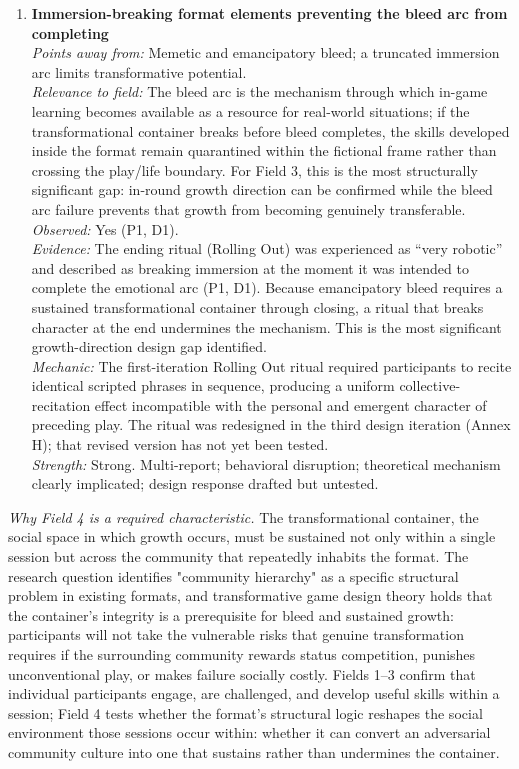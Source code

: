 \begin{enumerate}
\item \textbf{Immersion-breaking format elements preventing the bleed arc from completing}\\
\textit{Points away from:} Memetic and emancipatory bleed; a truncated immersion arc limits transformative potential.\\
\textit{Relevance to field:} The bleed arc is the mechanism through which in-game learning becomes available as a resource for real-world situations; if the transformational container breaks before bleed completes, the skills developed inside the format remain quarantined within the fictional frame rather than crossing the play/life boundary. For Field 3, this is the most structurally significant gap: in-round growth direction can be confirmed while the bleed arc failure prevents that growth from becoming genuinely transferable.\\
\textit{Observed:} Yes (P1, D1).\\
\textit{Evidence:} The ending ritual (Rolling Out) was experienced as ``very robotic'' and described as breaking immersion at the moment it was intended to complete the emotional arc (P1, D1). Because emancipatory bleed requires a sustained transformational container through closing, a ritual that breaks character at the end undermines the mechanism. This is the most significant growth-direction design gap identified.\\
\textit{Mechanic:} The first-iteration Rolling Out ritual required participants to recite identical scripted phrases in sequence, producing a uniform collective-recitation effect incompatible with the personal and emergent character of preceding play. The ritual was redesigned in the third design iteration (Annex H); that revised version has not yet been tested.\\
\textit{Strength:} Strong. Multi-report; behavioral disruption; theoretical mechanism clearly implicated; design response drafted but untested.

\end{enumerate}

\bigskip


\noindent\textit{Why Field 4 is a required characteristic.} The transformational container, the social space in which growth occurs, must be sustained not only within a single session but across the community that repeatedly inhabits the format. The research question identifies "community hierarchy" as a specific structural problem in existing formats, and transformative game design theory holds that the container's integrity is a prerequisite for bleed and sustained growth: participants will not take the vulnerable risks that genuine transformation requires if the surrounding community rewards status competition, punishes unconventional play, or makes failure socially costly. Fields 1--3 confirm that individual participants engage, are challenged, and develop useful skills within a session; Field 4 tests whether the format's structural logic reshapes the social environment those sessions occur within: whether it can convert an adversarial community culture into one that sustains rather than undermines the container.

